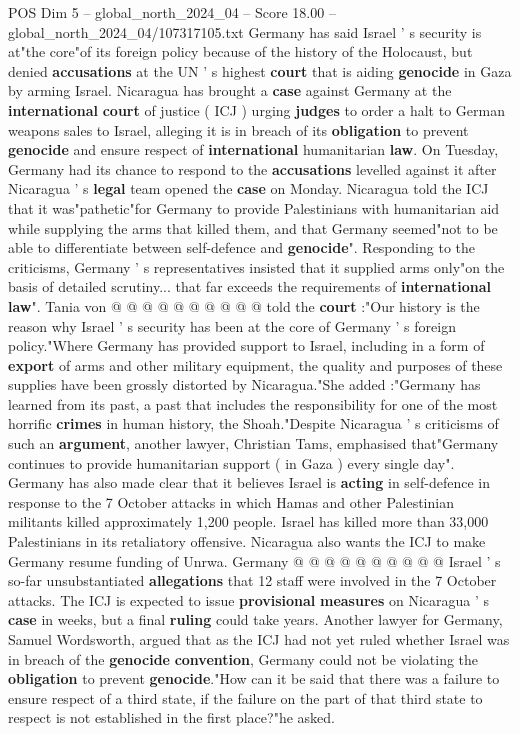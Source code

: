 \begin{textsample}{POS Dim 5 – global\_north\_2024\_04 – Score 18.00 – global\_north\_2024\_04/107317105.txt}  \label{ex:f5_pos_265}
Germany has said Israel ' s security is at"the core"of its foreign policy because of the history of the Holocaust, but denied \textbf{accusations} at the UN ' s highest \textbf{court} that is aiding \textbf{genocide} in Gaza by arming Israel.
Nicaragua has brought a \textbf{case} against Germany at the \textbf{international} \textbf{court} of justice ( ICJ ) urging \textbf{judges} to order a halt to German weapons sales to Israel, alleging it is in breach of its \textbf{obligation} to prevent \textbf{genocide} and ensure respect of \textbf{international} humanitarian \textbf{law}.
On Tuesday, Germany had its chance to respond to the \textbf{accusations} levelled against it after Nicaragua ' s \textbf{legal} team opened the \textbf{case} on Monday.
Nicaragua told the ICJ that it was"pathetic"for Germany to provide Palestinians with humanitarian aid while supplying the arms that killed them, and that Germany seemed"not to be able to differentiate between self-defence and \textbf{genocide}".
Responding to the criticisms, Germany ' s representatives insisted that it supplied arms only"on the basis of detailed scrutiny... that far exceeds the requirements of \textbf{international} \textbf{law}".
Tania von @ @ @ @ @ @ @ @ @ @ told the \textbf{court} :"Our history is the reason why Israel ' s security has been at the core of Germany ' s foreign policy."Where Germany has provided support to Israel, including in a form of \textbf{export} of arms and other military equipment, the quality and purposes of these supplies have been grossly distorted by Nicaragua."She added :"Germany has learned from its past, a past that includes the responsibility for one of the most horrific \textbf{crimes} in human history, the Shoah."Despite Nicaragua ' s criticisms of such an \textbf{argument}, another lawyer, Christian Tams, emphasised that"Germany continues to provide humanitarian support ( in Gaza ) every single day".
Germany has also made clear that it believes Israel is \textbf{acting} in self-defence in response to the 7 October attacks in which Hamas and other Palestinian militants killed approximately 1,200 people.
Israel has killed more than 33,000 Palestinians in its retaliatory offensive.
Nicaragua also wants the ICJ to make Germany resume funding of Unrwa.
Germany @ @ @ @ @ @ @ @ @ @ Israel ' s so-far unsubstantiated \textbf{allegations} that 12 staff were involved in the 7 October attacks.
The ICJ is expected to issue \textbf{provisional} \textbf{measures} on Nicaragua ' s \textbf{case} in weeks, but a final \textbf{ruling} could take years.
Another lawyer for Germany, Samuel Wordsworth, argued that as the ICJ had not yet ruled whether Israel was in breach of the \textbf{genocide} \textbf{convention}, Germany could not be violating the \textbf{obligation} to prevent \textbf{genocide}."How can it be said that there was a failure to ensure respect of a third state, if the failure on the part of that third state to respect is not established in the first place?"he asked.

\end{textsample}
